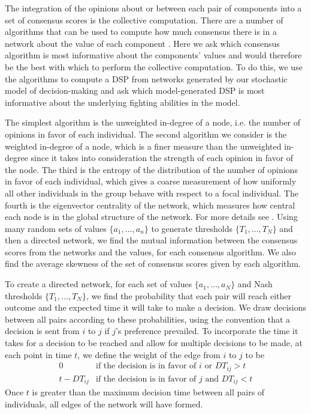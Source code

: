 \documentclass{pnastwo}
\begin{document}
\begin{article}
The integration of the opinions about or between each pair of components into a set of consensus scores is the collective computation. There are a number of algorithms that can be used to compute how much consensus there is in a network about the value of each component \cite{Brush:2013fk, Flack:2006uq}.  Here we ask which consensus algorithm is most informative about the components' values and would therefore be the best with which to perform the collective computation. To do this, we use the algorithms to compute a DSP from networks generated by our stochastic model of decision-making and ask which model-generated DSP is most informative about the underlying fighting abilities in the model. 

The simplest algorithm is the unweighted in-degree of a node, i.e. the number of opinions in favor of each individual.  The second algorithm we consider is the weighted in-degree of a node, which is a finer measure than the unweighted in-degree since it takes into consideration the strength of each opinion in favor of the node.  The third is the entropy of the distribution of the number of opinions in favor of each individual, which gives a coarse measurement of how uniformly all other individuals in the group behave with respect to a focal individual.  The fourth is the eigenvector centrality of the network, which measures how central each node is in the global structure of the network.  For more details see \cite{Brush:2013fk}. Using many random sets of values $\{a_1,\dots,a_n\}$ to generate thresholds $\{T_1,\dots,T_N\}$ and then a directed network, we find the mutual information between the consensus scores from the networks and the values, for each consensus algorithm. We also find the average skewness of the set of consensus scores given by each algorithm.

To create a directed network, for each set of values $\{a_1,\dots,a_N\}$ and Nash thresholds $\{T_1,\dots,T_N\}$, we find the probability that each pair will reach either outcome and the expected time it will take to make a decision.  We draw decisions between all pairs according to these probabilities, using the convention that a decision is sent from $i$ to $j$ if $j$'s preference prevailed.  To incorporate the time it takes for a decision to be reached and allow for multiple decisions to be made, at each point in time $t$, we define the weight of the edge from $i$ to $j$ to be
$$
\begin{array}{ll}
0 & \text{if the decision is in favor of } i\text{ or } DT_{ij}>t 
\\t-DT_{ij} & \text{if the decision is in favor of } j\text{ and } DT_{ij}<t 
\end{array}
$$
Once $t$ is greater than the maximum decision time between all pairs of individuals, all edges of the network will have formed.



\end{article}
\end{document}
